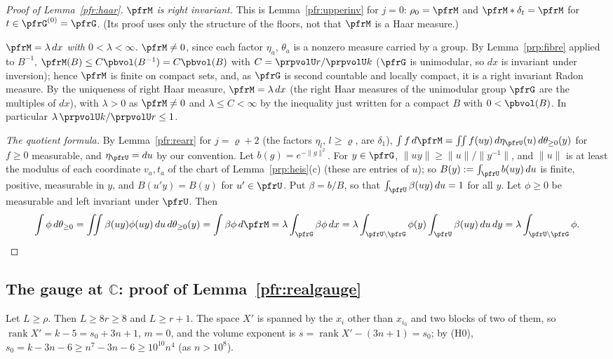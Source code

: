 \documentclass[10pt]{amsart}
\theoremstyle{definition}
\theoremstyle{remark}
\newcommand{\C}{\mathbb C}
\begin{document}
\begin{proof}[Proof of Lemma~\ref{pfr:haar}]
\emph{$\pfrM$ is right invariant.} This is Lemma~\ref{pfr:upperinv} for $j=0$: $\rho_0=\pfrM$ and
$\pfrM*\delta_t=\pfrM$ for $t\in\pfrG^{(0)}=\pfrG$. (Its proof uses only the structure of the floors, not that
$\pfrM$ is a Haar measure.)

\emph{$\pfrM=\lambda\,dx$ with $0<\lambda<\infty$.} $\pfrM\neq0$, since each factor $\eta_a$, $\theta_a$ is a
nonzero measure carried by a group. By Lemma~\ref{prp:fibre} applied to $B^{-1}$, $\pfrM(B)\le C\pbvol(B^{-1})
=C\pbvol(B)$ with $C=\prpvolU r/\prpvolU k$ ($\pfrG$ is unimodular, so $dx$ is invariant under inversion);
hence $\pfrM$ is finite on compact sets, and, as $\pfrG$ is second countable and locally compact, it is a
right invariant Radon measure. By the uniqueness of right Haar measure, $\pfrM=\lambda\,dx$ (the right Haar
measures of the unimodular group $\pfrG$ are the multiples of $dx$), with $\lambda>0$ as $\pfrM\ne0$ and
$\lambda\le C<\infty$ by the inequality just written for a compact $B$ with $0<\pbvol(B)$. In particular
$\lambda\,\prpvolU k/\prpvolU r\le1$.

\emph{The quotient formula.} By Lemma~\ref{pfr:rearr} for $j=\varrho+2$ (the factors $\eta_l$, $l\ge\varrho$, are
$\delta_1$), $\int f\,d\pfrM=\iint f(uy)\,d\eta_\pfrU(u)\,d\theta_{\ge0}(y)$ for $f\ge0$ measurable, and
$\eta_\pfrU=du$ by our convention. Let $b(g)=e^{-\|g\|^2}$. For $y\in\pfrG$, $\|uy\|\ge\|u\|/\|y^{-1}\|$, and
$\|u\|$ is at least the modulus of each coordinate $v_a,t_a$ of the chart of Lemma~\ref{prp:heis}(c) (these
are entries of $u$); so $B(y):=\int_\pfrU b(uy)\,du$ is finite, positive, measurable in $y$, and
$B(u'y)=B(y)$ for $u'\in\pfrU$. Put $\beta=b/B$, so that $\int_\pfrU\beta(uy)\,du=1$ for all $y$. Let $\phi\ge0$ be measurable and
left invariant under $\pfrU$. Then
\[
\int\phi\,d\theta_{\ge0}=\iint\beta(uy)\phi(uy)\,du\,d\theta_{\ge0}(y)=\int\beta\phi\,d\pfrM=\lambda\int_\pfrG\beta\phi\,dx
=\lambda\int_{\pfrU\backslash\pfrG}\phi(y)\int_\pfrU\beta(uy)\,du\,dy=\lambda\int_{\pfrU\backslash\pfrG}\phi.\qedhere
\]
\end{proof}

\subsection{The gauge at $\C$: proof of Lemma~\ref{pfr:realgauge}}\label{prp:ss-gauge}

Let $L\ge\rho$. Then $L\ge8r\ge8$ and $L\ge r+1$. The space $X'$ is spanned by the $x_i$ other than $x_{i_0}$
and two blocks of two of them, so $\operatorname{rank}X'=k-5=s_0+3n+1$, $m=0$, and the volume exponent is
$s=\operatorname{rank}X'-(3n+1)=s_0$; by (H0), $s_0=k-3n-6\ge n^7-3n-6\ge10^{10}n^4$ (as $n>10^8$).
\end{document}
